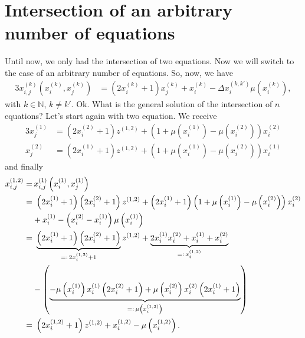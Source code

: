 \section{Intersection of an arbitrary number of equations}
\label{s:intarbitrarynumbeqs}
Until now, we only had the intersection of two equations. Now we will switch to the case of an arbitrary number of equations. So, now, we have
\begin{alignat}{3}
	x_{i,j}^{\left(k\right)}\left(x_{i}^{\left(k\right)}, x_{j}^{\left(k\right)}\right) &= \left(2x_{i}^{\left(k\right)} + 1\right)x_{j}^{\left(k\right)} + x_{i}^{\left(k\right)} - \Delta x_{i}^{\left(k,k\prime\right)}\mu\left(x_{i}^{\left(k\right)}\right), \label{eq:intarbnumb_geneq}
\end{alignat}
with $k \in \mathbb{N}$, $k \neq k\prime$. Ok. What is the general solution of the intersection of $n$ equations? Let's start again with two equation. We receive
\begin{alignat}{3}
	x_{j}^{\left(1\right)} &= \left(2x_{i}^{\left(2\right)} + 1\right)z^{\left(1,2\right)} + \left(1 + \mu\left(x_{i}^{\left(1\right)}\right) - \mu\left(x_{i}^{\left(2\right)}\right)\right)x_{i}^{\left(2\right)} \label{eq:step1_sol_xj1} \\
	x_{j}^{\left(2\right)} &= \left(2x_{i}^{\left(1\right)} + 1\right)z^{\left(1,2\right)} + \left(1 + \mu\left(x_{i}^{\left(1\right)}\right) - \mu\left(x_{i}^{\left(2\right)}\right)\right)x_{i}^{\left(1\right)} \label{eq:step1_sol_xj2}
\end{alignat}
and finally
\begin{alignat}{3}
	x_{i,j}^{\left(1,2\right)} =& \, x_{i,j}^{\left(1\right)}\left(x_{i}^{\left(1\right)},x_{j}^{\left(1\right)}\right) \notag \\
	=& \ \left(2x_{i}^{\left(1\right)} + 1\right)\left(2x_{i}^{\left(2\right)} + 1\right)z^{\left(1,2\right)}
	+ \left(2x_{i}^{\left(1\right)} + 1\right)\left(1 + \mu\left(x_{i}^{\left(1\right)}\right) - \mu\left(x_{i}^{\left(2\right)}\right)\right)x_{i}^{\left(2\right)} \notag \\  
	&+ x_{i}^{\left(1\right)} - \left(x_{i}^{\left(2\right)} - x_{i}^{\left(1\right)}\right)\mu\left(x_{i}^{\left(1\right)}\right) \notag \\
	=& \ \underbrace{\left(2x_{i}^{\left(1\right)} + 1\right)\left(2x_{i}^{\left(2\right)} + 1\right)}_{=: \, 2x_{i}^{\left(1,2\right)} + 1}z^{\left(1,2\right)}
	+ \underbrace{2x_{i}^{\left(1\right)}x_{i}^{\left(2\right)} + x_{i}^{\left(1\right)} + x_{i}^{\left(2\right)}}_{=: \, x_{i}^{\left(1,2\right)}} \notag \\
	&- \left(\underbrace{-\mu\left(x_{i}^{\left(1\right)}\right)x_{i}^{\left(1\right)}\left(2x_{i}^{\left(2\right)} + 1\right)
	+ \mu\left(x_{i}^{\left(2\right)}\right)x_{i}^{\left(2\right)}\left(2x_{i}^{\left(1\right)} + 1\right)}_{=: \, \mu\left(x_{i}^{\left(1,2\right)}\right)}\right) \notag \\
	=& \ \left(2x_{i}^{\left(1,2\right)} + 1\right)z^{\left(1,2\right)} + x_{i}^{\left(1,2\right)} - \mu\left(x_{i}^{\left(1,2\right)}\right). \label{eq:step1_sol_xij12}
\end{alignat}

